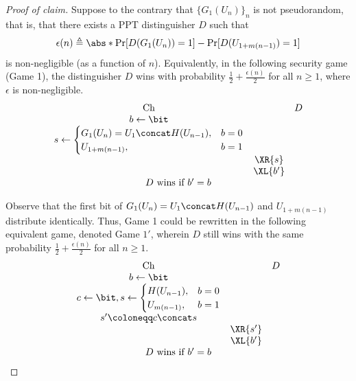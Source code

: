 \begin{answer}[i]
\begin{proof}[Proof of claim]
    Suppose to the contrary that $\{G_1(U_n)\}_n$ is not pseudorandom, that is, that there exists a PPT distinguisher $D$ such that
    \[
        \epsilon(n)\triangleq \abs*{\Pr[D(G_1(U_n)) = 1]  -\Pr[D(U_{1+m(n-1)}) = 1]} 
    \]
    is non-negligible (as a function of $n$). Equivalently, in the following security game (Game 1), the distinguisher $D$ wins with probability $\frac{1}{2}+\frac{\epsilon(n)}{2}$ for all $n\ge 1$, where $\epsilon$ is non-negligible.
    {
        \[
            \begin{array}{@{} c c c @{}}
            \text{Ch} & & D \\
            b \leftarrow \bit & & \\
            s \leftarrow \begin{cases} 
                G_1(U_n)= U_1 \concat H(U_{n-1}), &b = 0 \\
                U_{1+m(n-1)}, &b = 1 
            \end{cases} & & \\
            & \XR{s} & \\
            & \XL{b'} & \\
            \multicolumn{3}{c}{\text{$D$ wins if $b' = b$}}
        \end{array}
        \]
        \label{fig:p3-game1}
    }

    Observe that the first bit of $G_1(U_n)=U_1\concat H(U_{n-1})$ and $U_{1+m(n-1)}$ distribute identically. Thus, Game 1 could be rewritten in the following equivalent game, denoted Game $1'$, wherein $D$ still wins with the same probability $\frac{1}{2}+\frac{\epsilon(n)}{2}$ for all $n\ge 1$.
    {
        \[
            \begin{array}{@{} c c c @{}}
            \text{Ch} & & D \\
            b \leftarrow \bit & & \\
            c \leftarrow \bit, s \leftarrow \begin{cases} 
                H(U_{n-1}), &b = 0 \\
                U_{m(n-1)}, &b = 1 
            \end{cases} & & \\
            s'\coloneqq c\concat s & & \\
            & \XR{s'} & \\
            & \XL{b'} & \\
            \multicolumn{3}{c}{\text{$D$ wins if $b' = b$}}
        \end{array}
        \]
        \label{fig:p3-game1'}
    }


\end{proof}
\end{answer}

